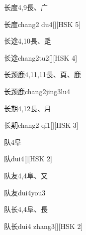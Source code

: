 \begin{entry}{长度}{4,9}{⾧、⼴}
  \begin{phonetics}{长度}{chang2 du4}[][HSK 5]
  \end{phonetics}
\end{entry}

\begin{entry}{长途}{4,10}{⾧、⾡}
  \begin{phonetics}{长途}{chang2tu2}[][HSK 4]
  \end{phonetics}
\end{entry}

\begin{entry}{长颈鹿}{4,11,11}{⾧、⾴、⿅}
  \begin{phonetics}{长颈鹿}{chang2jing3lu4}
  \end{phonetics}
\end{entry}

\begin{entry}{长期}{4,12}{⾧、⽉}
  \begin{phonetics}{长期}{chang2 qi1}[][HSK 3]
  \end{phonetics}
\end{entry}

\begin{entry}{队}{4}{⾩}
  \begin{phonetics}{队}{dui4}[][HSK 2]
  \end{phonetics}
\end{entry}

\begin{entry}{队友}{4,4}{⾩、⼜}
  \begin{phonetics}{队友}{dui4you3}
  \end{phonetics}
\end{entry}

\begin{entry}{队长}{4,4}{⾩、⾧}
  \begin{phonetics}{队长}{dui4 zhang3}[][HSK 2]
  \end{phonetics}
\end{entry}

